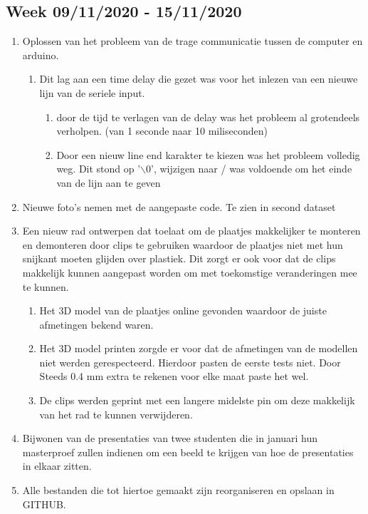 \documentclass{article}
\begin{document}
\subsection{Week 09/11/2020 - 15/11/2020}

\begin{enumerate}[1]
\item Oplossen van het probleem van de trage communicatie tussen de computer en arduino. 
	\begin{enumerate}[a]
	\item Dit lag aan een time delay die gezet was voor het inlezen van een nieuwe lijn van de seriele input. 
		\begin{enumerate}[1]
		\item door de tijd te verlagen van de delay was het probleem al grotendeels verholpen. (van 1 seconde naar 10 miliseconden)
		\item Door een nieuw line end karakter te kiezen was het probleem volledig weg. Dit stond op '$\backslash$0', wijzigen naar / was voldoende om het einde van de lijn aan te geven
		\end{enumerate}
	\end{enumerate}
\item Nieuwe foto's nemen met de aangepaste code. Te zien in second dataset
\item Een nieuw rad ontwerpen dat toelaat om de plaatjes makkelijker te monteren en demonteren door clips te gebruiken waardoor de plaatjes niet met hun snijkant moeten glijden over plastiek. Dit zorgt er ook voor dat de clips makkelijk kunnen aangepast worden om met toekomstige veranderingen mee te kunnen.
	\begin{enumerate}[a]
	\item Het 3D model van de plaatjes online gevonden waardoor de juiste afmetingen bekend waren.
	\item Het 3D model printen zorgde er voor dat de afmetingen van de modellen niet werden gerespecteerd. Hierdoor pasten de eerste tests niet. Door Steeds 0.4 mm extra te rekenen voor elke maat paste het wel. 
	\item De clips werden geprint met een langere midelste pin om deze makkelijk van het rad te kunnen verwijderen. 
	\end{enumerate}
\item Bijwonen van de presentaties van twee studenten die in januari hun masterproef zullen indienen om een beeld te krijgen van hoe de presentaties in elkaar zitten.
\item Alle bestanden die tot hiertoe gemaakt zijn reorganiseren en opslaan in GITHUB.

\end{enumerate}
\end{document}
